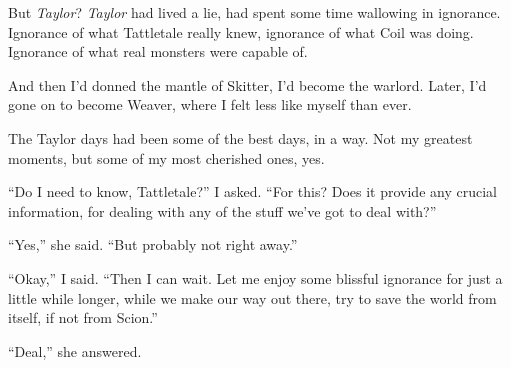 But \emph{Taylor}?  \emph{Taylor} had lived a lie, had spent some time wallowing in ignorance.  Ignorance of what Tattletale really knew, ignorance of what Coil was doing.  Ignorance of what real monsters were capable of.



And then I'd donned the mantle of Skitter, I'd become the warlord.  Later, I'd gone on to become Weaver, where I felt less like myself than ever.



The Taylor days had been some of the best days, in a way.  Not my greatest moments, but some of my most cherished ones, yes.



``Do I need to know, Tattletale?''  I asked.  ``For this?  Does it provide any crucial information, for dealing with any of the stuff we've got to deal with?''



``Yes,'' she said.  ``But probably not right away.''



``Okay,'' I said.  ``Then I can wait.  Let me enjoy some blissful ignorance for just a little while longer, while we make our way out there, try to save the world from itself, if not from Scion.''



``Deal,'' she answered.





